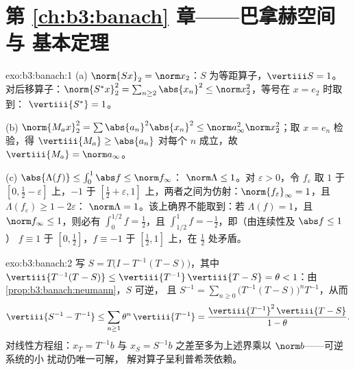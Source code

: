 \section*{第 \ref{ch:b3:banach} 章——巴拿赫空间与
基本定理}

\begin{solution}{exo:b3:banach:1}
(a) $\norm{Sx}_2 = \norm x_2$：$S$ 为等距算子，$\vertiii S =
1$。对后移算子：$\norm{S^*x}_2^2 = \sum_{n \geq
2}\abs{x_n}^2 \leq \norm x_2^2$，等号在 $x = e_2$ 时取到：
$\vertiii{S^*} = 1$。

(b) $\norm{M_ax}_2^2 = \sum\abs{a_n}^2\abs{x_n}^2 \leq \norm
a_\infty^2\norm x_2^2$；取 $x = e_n$ 检验，得 $\vertiii{M_a}
\geq \abs{a_n}$ 对每个 $n$ 成立，故 $\vertiii{M_a} = \norm a_\infty$。

(c) $\abs{\Lambda(f)} \leq \int_0^1\abs f \leq \norm f_\infty$：
$\norm\Lambda \leq 1$。对 $\varepsilon > 0$，令 $f_\varepsilon$
取 $1$ 于 $[0, \frac12 - \varepsilon]$ 上，$-1$ 于 $[\frac12 +
\varepsilon, 1]$ 上，两者之间为仿射：$\norm{f_\varepsilon}_\infty =
1$，且 $\Lambda(f_\varepsilon) \geq 1 - 2\varepsilon$：
$\norm\Lambda = 1$。该上确界不能取到：若 $\Lambda(f) = 1$，且 $\norm
f_\infty \leq 1$，则必有 $\int_0^{1/2}f = \frac12$，且
$\int_{1/2}^1 f = -\frac12$，即（由连续性及 $\abs f \leq 1$）
$f \equiv 1$ 于 $[0, \frac12]$，$f \equiv -1$ 于 $[\frac12,
1]$ 上，在 $\frac12$ 处矛盾。
\end{solution}

\begin{solution}{exo:b3:banach:2}
写 $S = T\bigl(I - T^{-1}(T - S)\bigr)$，其中
$\vertiii{T^{-1}(T-S)} \leq \vertiii{T^{-1}}\,\vertiii{T - S} =
\theta < 1$：由\cref{prop:b3:banach:neumann}，$S$ 可逆，
且 $S^{-1} = \sum_{n\geq0}\bigl(T^{-1}(T -
S)\bigr)^nT^{-1}$，从而
\[
\vertiii{S^{-1} - T^{-1}} \leq
\sum_{n\geq1}\theta^n\,\vertiii{T^{-1}}
= \frac{\vertiii{T^{-1}}^2\,\vertiii{T - S}}{1 - \theta}.
\]
对线性方程组：$x_T = T^{-1}b$ 与 $x_S = S^{-1}b$
之差至多为上述界乘以 $\norm b$——可逆系统的小
扰动仍唯一可解，
解对算子呈利普希茨依赖。
\end{solution}

